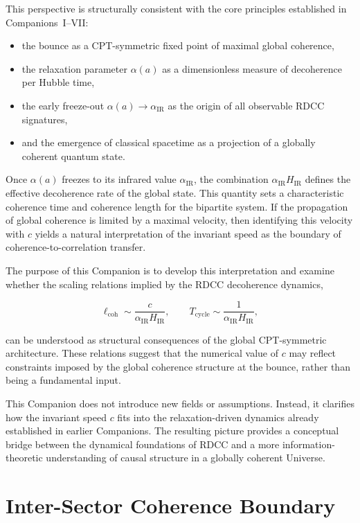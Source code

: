 \documentclass[11pt,a4paper]{article}
\begin{document}
This perspective is structurally consistent with the core principles established
in Companions~I–VII:
\begin{itemize}
    \item the bounce as a CPT-symmetric fixed point of maximal global coherence,
    \item the relaxation parameter $\alpha(a)$ as a dimensionless measure of
    decoherence per Hubble time,
    \item the early freeze-out $\alpha(a) \rightarrow \alpha_{\mathrm{IR}}$ as the origin of all
    observable RDCC signatures,
    \item and the emergence of classical spacetime as a projection of a globally
    coherent quantum state.
\end{itemize}

Once $\alpha(a)$ freezes to its infrared value $\alpha_{\mathrm{IR}}$, the combination
$\alpha_{\mathrm{IR}} H_{\mathrm{IR}}$ defines the effective decoherence rate of the global state.
This quantity sets a characteristic coherence time and coherence length for the
bipartite system. If the propagation of global coherence is limited by a maximal
velocity, then identifying this velocity with $c$ yields a natural interpretation of
the invariant speed as the boundary of coherence-to-correlation transfer.

The purpose of this Companion is to develop this interpretation and examine
whether the scaling relations implied by the RDCC decoherence dynamics,


\[
    \ell_{\mathrm{coh}} \sim \frac{c}{\alpha_{\mathrm{IR}} H_{\mathrm{IR}}}, \qquad
    T_{\mathrm{cycle}} \sim \frac{1}{\alpha_{\mathrm{IR}} H_{\mathrm{IR}}},
\]


can be understood as structural consequences of the global CPT-symmetric
architecture. These relations suggest that the numerical value of $c$ may reflect
constraints imposed by the global coherence structure at the bounce, rather than
being a fundamental input.

This Companion does not introduce new fields or assumptions. Instead, it
clarifies how the invariant speed $c$ fits into the relaxation-driven dynamics
already established in earlier Companions. The resulting picture provides a
conceptual bridge between the dynamical foundations of RDCC and a more
information-theoretic understanding of causal structure in a globally coherent
Universe.

\section{Inter-Sector Coherence Boundary}
\end{document}
